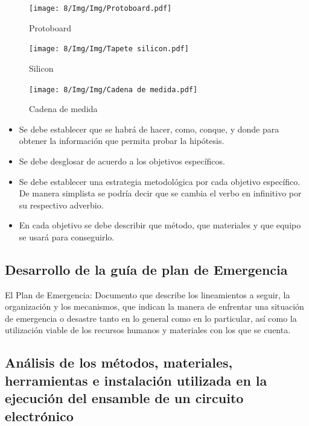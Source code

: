     \begin{figure}[H]
        \centering
        \texttt{[image: 8/Img/Img/Protoboard.pdf]}
        \caption{Protoboard}
        \label{Protoboard}
    \end{figure}
    
    \begin{figure}[H]
        \centering
        \texttt{[image: 8/Img/Img/Tapete silicon.pdf]}
        \caption{Silicon}
        \label{Siliconl}
    \end{figure}
    
    \begin{figure}[H]
        \centering
        \texttt{[image: 8/Img/Img/Cadena de medida.pdf]}
        \caption{Cadena de medida}
        \label{Cadena de medida}
    \end{figure}
    
    
    \begin{itemize}
        \item Se debe establecer que se habrá de hacer, como, conque, y donde para obtener la información que permita probar la hipótesis.  
        \item Se debe desglosar de acuerdo a los objetivos específicos. 
        \item Se debe establecer una estrategia metodológica por cada objetivo específico. De manera simplista se podría decir que se cambia el verbo en infinitivo por su respectivo adverbio.
        \item En cada objetivo se debe describir que método, que materiales y que equipo se usará para conseguirlo.
    \end{itemize}
    \subsection{Desarrollo de la guía de plan de Emergencia}
    
    El Plan de Emergencia: Documento que describe los lineamientos a seguir, la organización y los mecanismos, que indican la manera de enfrentar una situación de emergencia o desastre tanto en lo general como en lo particular, así como la utilización viable de los recursos humanos y materiales con los que se cuenta.
    \subsection{Análisis de los métodos, materiales, herramientas e instalación utilizada en la ejecución del ensamble de un circuito electrónico}
    
